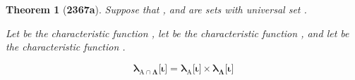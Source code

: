 \documentclass[preview]{standalone}
\newtheorem{theorem}{Theorem}
\begin{document}
\begin{theorem}[\textbf{2367a}]
    Suppose that , and \bm{$\Lambda$} are sets with universal set \bm{$\Omega$}. 
    \begin{center}
    Let  be the characteristic function 
    , 
    let  be the characteristic function 
    ,
    and let \bm{$\lambda_{\Lambda}$} be the characteristic function  
    .
    \end{center}
    \vspace{1\baselineskip}
    \begin{equation*}
        \bm{
            \lambda_{\mathrm{A} \cap \Lambda}\big[ \iota \big] 
                = 
            \lambda_{\mathrm{A}}\big[ \iota \big] 
                \times 
            \lambda_{\Lambda}\big[ \iota \big]
            }
    \end{equation*}
\end{theorem}
\end{document}
